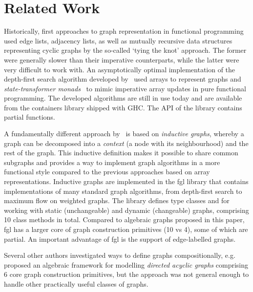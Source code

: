 \section{Related Work}\label{sec-related}

Historically, first approaches to graph representation in functional programming
used edge lists, adjacency lists, as well as mutually recursive data structures
representing cyclic graphs by the so-called `tying the knot' approach. The former
were generally slower
than their imperative counterparts, while the latter were very difficult to
work with. An asymptotically optimal implementation of the depth-first search
algorithm developed by~\citet{1995_king_graphs} used arrays to represent graphs
and \emph{state-transformer monads}~\cite{1994_launchbury_st} to mimic imperative array
updates in pure functional programming. The developed algorithms are still in
use today and are available from the \textsf{containers} library shipped with GHC.
The API of the library contains partial functions.

A fundamentally different approach by~\citet{2001_erwig_inductive} is based
on \emph{inductive graphs}, whereby a graph can be decomposed into a \emph{context}
(a node with its neighbourhood) and the rest of the graph. This inductive
definition makes it possible to share common subgraphs and provides a way to
implement graph algorithms in a more functional style compared to the previous
approaches based on array representations. Inductive graphs are implemented in
the \textsf{fgl} library that contains implementations of many standard graph
algorithms, from depth-first search to maximum flow on weighted graphs. The library
defines type classes  and  for working with static
(unchangeable) and dynamic (changeable) graphs, comprising 10 class methods in total.
Compared to algebraic graphs proposed in this paper, \textsf{fgl} has a larger
core of graph construction primitives (10 vs 4), some of which are partial. An
important advantage of \textsf{fgl} is the support of edge-labelled graphs.

Several other authors investigated ways to define graphs compositionally,
e.g.~\citet{1995_gibbons_algebra} proposed an algebraic framework for modelling
\emph{directed acyclic graphs} comprising 6 core graph construction primitives,
but the approach was not general enough to handle other practically useful classes
of graphs.

